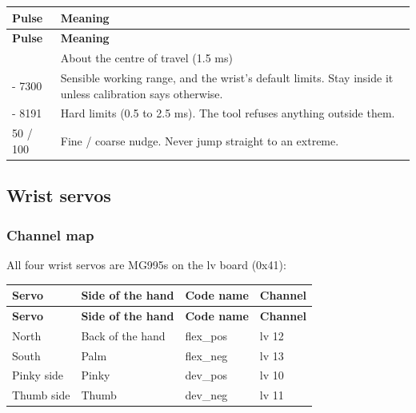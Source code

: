 \documentclass[11pt,letterpaper]{article}
\newcommand{\code}[1]{\textcolor{codeblue}{\ttfamily\smaller\relax #1}}
\begin{document}
{\small
\begin{longtable}{|>{\raggedright\arraybackslash}p{}|>{\raggedright\arraybackslash}p{}|}
\hline
\rowcolor{tblhead}\textbf{Pulse} & \textbf{Meaning} \\ \hline
\endfirsthead
\hline
\rowcolor{tblhead}\textbf{Pulse} & \textbf{Meaning} \\ \hline
\endhead
4900 & About the centre of travel (1.5 ms) \\ \hline
2500 - 7300 & Sensible working range, and the wrist's default limits. Stay inside it unless calibration says otherwise. \\ \hline
1638 - 8191 & Hard limits (0.5 to 2.5 ms). The tool refuses anything outside them. \\ \hline
\textpm{}50 / \textpm{}100 & Fine / coarse nudge. Never jump straight to an extreme. \\ \hline
\end{longtable}}


\subsection{Wrist servos}

\subsubsection*{Channel map}
All four wrist servos are MG995s on the \code{lv} board (0x41):

{\small
\begin{longtable}{|>{\raggedright\arraybackslash}p{}|>{\raggedright\arraybackslash}p{}|>{\raggedright\arraybackslash}p{}|>{\raggedright\arraybackslash}p{}|}
\hline
\rowcolor{tblhead}\textbf{Servo} & \textbf{Side of the hand} & \textbf{Code name} & \textbf{Channel} \\ \hline
\endfirsthead
\hline
\rowcolor{tblhead}\textbf{Servo} & \textbf{Side of the hand} & \textbf{Code name} & \textbf{Channel} \\ \hline
\endhead
North & Back of the hand & \code{flex\_\allowbreak{}pos} & lv 12 \\ \hline
South & Palm & \code{flex\_\allowbreak{}neg} & lv 13 \\ \hline
Pinky side & Pinky & \code{dev\_\allowbreak{}pos} & lv 10 \\ \hline
Thumb side & Thumb & \code{dev\_\allowbreak{}neg} & lv 11 \\ \hline
\end{longtable}}
\end{document}
